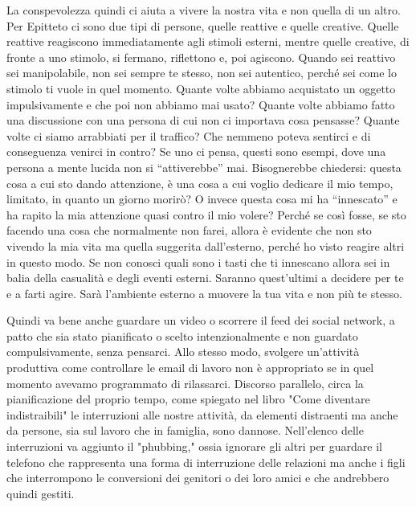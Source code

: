 \documentclass[12pt]{book} %
\begin{document}
La conspevolezza quindi ci aiuta a vivere la nostra vita e non quella di un altro.
Per Epitteto ci sono due tipi di persone, quelle reattive e quelle creative. Quelle reattive reagiscono immediatamente
agli stimoli esterni, mentre quelle creative, di fronte a uno stimolo, si fermano, riflettono e, poi agiscono. Quando
sei reattivo sei manipolabile, non sei sempre te stesso, non sei autentico, perché sei come lo stimolo ti vuole in quel
momento. Quante volte abbiamo acquistato un oggetto impulsivamente e che poi non abbiamo mai usato? Quante volte
abbiamo fatto una discussione con una persona di cui non ci importava cosa pensasse? Quante volte ci siamo arrabbiati
per il traffico? Che nemmeno poteva sentirci e di conseguenza venirci in contro? Se uno ci pensa, questi sono esempi,
dove una persona a mente lucida non si “attiverebbe” mai. Bisognerebbe chiedersi: questa cosa a cui sto dando
attenzione, è una cosa a cui voglio dedicare il mio tempo, limitato, in quanto un giorno morirò? O invece questa cosa
mi ha “innescato” e ha rapito la mia attenzione quasi contro il mio volere? Perché se così fosse, se sto facendo una
cosa che normalmente non farei, allora è evidente che non sto vivendo la mia vita ma quella suggerita
dall'esterno, perché ho visto reagire altri in questo modo. Se non conosci quali sono i tasti che ti innescano
allora sei in balia della casualità e degli eventi esterni. Saranno quest'ultimi a decidere per te
e a farti agire. Sarà l'ambiente esterno a muovere la tua vita e non più te stesso. 

Quindi va bene anche guardare un video o scorrere il feed dei social network, a patto che sia stato pianificato o scelto intenzionalmente e non guardato compulsivamente, senza pensarci. Allo stesso modo, svolgere un’attività produttiva come controllare le email di lavoro non è appropriato se in quel momento avevamo programmato di rilassarci. Discorso parallelo, circa la pianificazione del proprio tempo, come spiegato nel libro "Come diventare indistraibili"  le interruzioni alle nostre attività, da elementi distraenti ma anche da persone, sia sul lavoro che in famiglia, sono dannose. Nell'elenco delle interruzioni va aggiunto il "phubbing," ossia ignorare gli altri per guardare il telefono che rappresenta una forma di interruzione delle relazioni ma anche i figli che interrompono le conversioni dei genitori o dei loro amici e che andrebbero quindi gestiti.
\end{document}
